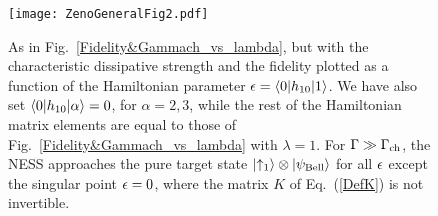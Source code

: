 \documentclass[aps,pra,letterpaper,twocolumn,showpacs,superscriptaddress,floatfix,longbibliography]{revtex4-1}
\begin{document}
\begin{figure}[t]
  \begin{center}
    \texttt{[image: ZenoGeneralFig2.pdf]}
    \caption{ As in Fig.~\ref{Fidelity&Gammach_vs_lambda}, but with
      the characteristic dissipative strength and the fidelity plotted
      as a function of the Hamiltonian parameter $\epsilon =
      \langle{0}|h_{10}|{1}\rangle$. We have also set
      $\langle{0}|h_{10}|{\alpha}\rangle=0$, for $\alpha=2,3$, while the rest of
      the Hamiltonian matrix elements are equal to those of
      Fig.~\ref{Fidelity&Gammach_vs_lambda} with $\lambda=1$.  For
      $\Gamma\gg \Gamma_{\rm{ch}}$, the NESS approaches the pure
      target state $|{\uparrow_1}\rangle\otimes|{\psi_{\rm{Bell}}}\rangle$ for
      all $\epsilon$ except the singular point $\epsilon=0$, where the matrix
      $K$ of Eq.~(\ref{DefK}) is not invertible. }
    \label{Fidelity&Gammach_vs_epsilon}
  \end{center}
\end{figure}
\end{document}
